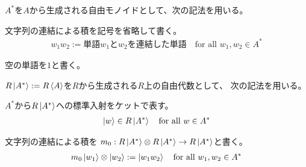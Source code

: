 {	$A^*$を$A$から生成される自由モノイドとして、次の記法を用いる。
	\begin{description}\setlength{\itemsep}{-1mm} %
		\item[積] 文字列の連結による積を記号を省略して書く。
		\begin{equation*}\begin{split}
			w_1w_2 := \text{単語$w_1$と$w_2$を連結した単語}
			\quad\text{for all } w_1,w_2\in A^*
		\end{split}\end{equation*}
		\item[単位元] 空の単語を$1$と書く。
	\end{description} %
	$R\mathinner{|{A^*}\rangle}:=R\mathinner{\langle{A}\rangle}$を$R$から生成される$R$上の自由代数として、
	次の記法を用いる。
	\begin{description}\setlength{\itemsep}{-1mm} %
		\item[標準基底] $A^*$から$R\mathinner{|{A^*}\rangle}$への標準入射をケットで表す。
		\begin{equation*}\begin{split}
			\mathinner{|{w}\rangle}\in R\mathinner{|{A^*}\rangle} \quad\text{for all } w\in A^*
		\end{split}\end{equation*}
		\item[積] 文字列の連結による積を
		$m_0:R\mathinner{|{A^*}\rangle}\otimes R\mathinner{|{A^*}\rangle}\to R\mathinner{|{A^*}\rangle}$と書く。
		\begin{equation*}\begin{split}
			m_0\mathinner{|{w_1}\rangle}\otimes\mathinner{|{w_2}\rangle} := \mathinner{|{w_1w_2}\rangle}
			\quad\text{for all } w_1,w_2\in A^*
		\end{split}\end{equation*}
	\end{description} %

}
